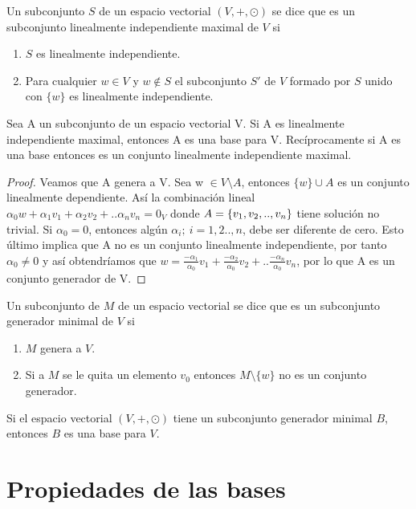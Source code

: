 \begin{dfn}
Un subconjunto $S$ de un espacio vectorial $(V, +, \odot)$ se dice que es un subconjunto linealmente independiente maximal de $V$ si\\
\begin{enumerate}
\item $S$ es linealmente independiente.
\item Para cualquier $w \in V$ y $w \notin S$ el subconjunto $S'$ de $V$ formado por $S$ unido con $\{w\}$ es linealmente independiente.
\end{enumerate}
\end{dfn}

\begin{theorem}
Sea A un subconjunto de un espacio vectorial V. Si A es linealmente independiente maximal, entonces A es una base para V. Recíprocamente si A es una base entonces es un conjunto linealmente independiente maximal.
\end{theorem}
\begin{proof}
Veamos que A genera a V. Sea w $\in V\setminus A$, entonces $\{w\}\cup A$ es un conjunto linealmente dependiente. Así la combinación lineal $\alpha_0 w+\alpha_1v_1+\alpha_2v_2+..\alpha_nv_n=0_V$ donde $A= \left\{v_1, v_2, .., v_n \right\} $ tiene solución no trivial. Si $\alpha_0=0$, entonces algún $\alpha_i;\ i=1, 2.., n$, debe ser diferente de cero. Esto último implica que A no es un conjunto linealmente independiente, por tanto $\alpha_0\neq 0$ y así obtendríamos que $w=\frac{-\alpha_1}{\alpha_0}v_1+\frac{-\alpha_2}{\alpha_0}v_2+..\frac{-\alpha_n}{\alpha_0}v_n$, por lo que A es un conjunto generador de V.
\end{proof}
\begin{dfn}
Un subconjunto de $M$ de un espacio vectorial se dice que es un subconjunto generador minimal de $V$ si
\begin{enumerate}
\item $M$ genera a $V$.
\item Si a $M$ se le quita un elemento $v_0$ entonces $M \setminus \{w\}$ no es un conjunto generador.
\end{enumerate}
\end{dfn}

\begin{theorem}
Si el espacio vectorial $(V , +, \odot)$ tiene un subconjunto generador minimal $B$, entonces $B$ es una base para $V$.
\end{theorem}


\section{Propiedades de las bases}
%

